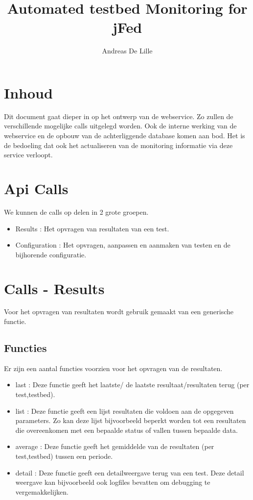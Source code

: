 \documentclass[11pt]{article}
\begin{document}
\title{Automated testbed Monitoring for jFed}
\author{Andreas De Lille}
\maketitle

\section{Inhoud}
Dit document gaat dieper in op het ontwerp van de webservice.
Zo zullen de verschillende mogelijke calls uitgelegd worden. Ook de interne werking van de webservice en de opbouw van de achterliggende database komen aan bod.
Het is de bedoeling dat ook het actualiseren van de monitoring informatie via deze service verloopt.

\section{Api Calls}
We kunnen de calls op delen in 2 grote groepen. 
\begin{itemize}
\item Results : Het opvragen van resultaten van een test.
\item Configuration : Het opvragen, aanpassen en aanmaken van testen en de bijhorende configuratie.
\end{itemize}

\section{Calls - Results}
Voor het opvragen van resultaten wordt gebruik gemaakt van een generische functie.

\subsection{Functies}
Er zijn een aantal functies voorzien voor het opvragen van de resultaten.
\begin{itemize}
\item last : Deze functie geeft het laatste/ de laatste resultaat/resultaten terug (per test,testbed).
\item list : Deze functie geeft een lijst resultaten die voldoen aan de opgegeven parameters. 
Zo kan deze lijst bijvoorbeeld beperkt worden tot een resultaten die overeenkomen met een bepaalde status of vallen tussen bepaalde data.
\item average : Deze functie geeft het gemiddelde van de resultaten (per test,testbed) tussen een periode.
\item detail : Deze functie geeft een detailweergave terug van een test. Deze detail weergave kan bijvoorbeeld ook logfiles bevatten om debugging te vergemakkelijken.
\end{itemize}
\end{document}
